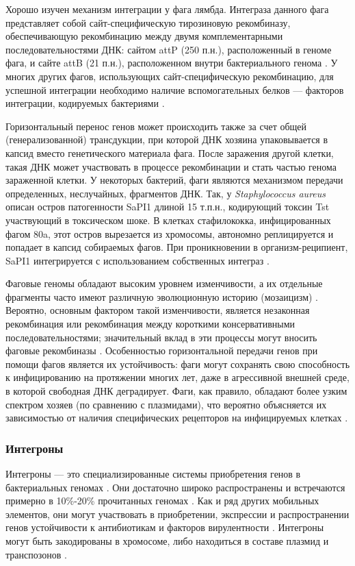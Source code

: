 Хорошо изучен механизм интеграции у фага лямбда. Интеграза данного фага представляет собой сайт-специфическую тирозиновую рекомбиназу, обеспечивающую рекомбинацию между двумя комплементарными последовательностями ДНК: сайтом attP (250 п.н.), расположенный в геноме фага, и сайте attB (21 п.н.), расположенном внутри бактериального генома \cite{mohaisen2020site}. У многих других фагов, использующих сайт-специфическую рекомбинацию, для успешной интеграции необходимо наличие вспомогательных белков --- факторов интеграции, кодируемых бактериями \cite{mohaisen2020site}. 


Горизонтальный перенос генов может происходить также за счет общей (генерализованной) трансдукции, при которой ДНК хозяина упаковывается в капсид вместо генетического материала фага. После заражения другой клетки, такая ДНК может участвовать в процессе рекомбинации и стать частью генома зараженной клетки. У некоторых бактерий, фаги являются механизмом передачи определенных, неслучайных, фрагментов ДНК. Так, у \textit{Staphylococcus aureus} описан остров патогенности SaPI1 длиной 15 т.п.н., кодирующий токсин Tst участвующий в токсическом шоке. В клетках стафилококка, инфицированных фагом 80a, этот остров вырезается из хромосомы, автономно реплицируется и попадает в капсид собираемых фагов. При проникновении в организм-реципиент, SaPI1 интегрируется с использованием собственных интеграз \cite{ruzin2001molecular}. 

Фаговые геномы обладают высоким уровнем изменчивости, а их отдельные фрагменты часто имеют различную эволюционную историю (мозаицизм) \cite{hatfull2011bacteriophages}. Вероятно, основным фактором такой изменчивости, является незаконная рекомбинация или рекомбинация между короткими консервативными последовательностями; значительный вклад в эти процессы могут вносить фаговые рекомбиназы \cite{hendrix2000origins, hatfull2011bacteriophages}. Особенностью горизонтальной передачи генов при помощи фагов является их устойчивость: фаги могут сохранять свою способность к инфицированию на протяжении многих лет, даже в агрессивной внешней среде, в которой свободная ДНК деградирует. Фаги, как правило, обладают более узким спектром хозяев (по сравнению с плазмидами), что вероятно объясняется их зависимостью от наличия специфических рецепторов на инфицируемых клетках \cite{myers2006role}.

\subsubsection{Интегроны}
Интегроны --- это специализированные системы приобретения генов в бактериальных геномах \cite{gillings2014integrons}. Они достаточно широко распространены и встречаются примерно в 10\%-20\% прочитанных геномах \cite{boucher2007integrons, cambray2010integrons}. Как и ряд других мобильных элементов, они могут участвовать в приобретении, экспрессии и распространении генов устойчивости к антибиотикам \cite{gillings2014integrons} и факторов вирулентности \cite{kovach1996putative}. Интегроны могут быть закодированы в хромосоме, либо находиться в составе плазмид и транспозонов \cite{boucher2007integrons}.

